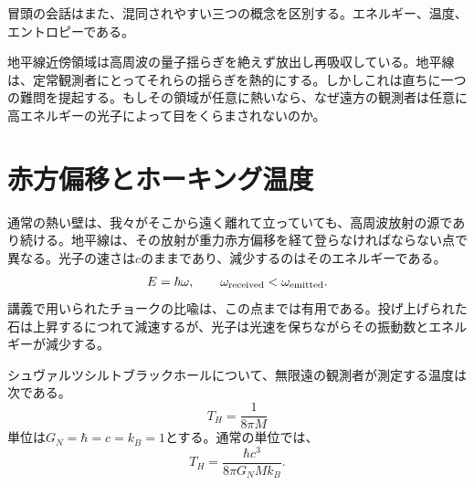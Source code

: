 冒頭の会話はまた、混同されやすい三つの概念を区別する。エネルギー、温度、エントロピーである。

\begin{classroomqa}
\end{classroomqa}


地平線近傍領域は高周波の量子揺らぎを絶えず放出し再吸収している。地平線は、定常観測者にとってそれらの揺らぎを熱的にする。しかしこれは直ちに一つの難問を提起する。もしその領域が任意に熱いなら、なぜ遠方の観測者は任意に高エネルギーの光子によって目をくらまされないのか。

\section{赤方偏移とホーキング温度}

通常の熱い壁は、我々がそこから遠く離れて立っていても、高周波放射の源であり続ける。地平線は、その放射が重力赤方偏移を経て登らなければならない点で異なる。光子の速さは\(c\)のままであり、減少するのはそのエネルギーである。
\begin{equation}
E=\hbar\omega,
\qquad
\omega_{\rm received}<\omega_{\rm emitted}.
\end{equation}
講義で用いられたチョークの比喩は、この点までは有用である。投げ上げられた石は上昇するにつれて減速するが、光子は光速を保ちながらその振動数とエネルギーが減少する。

シュヴァルツシルトブラックホールについて、無限遠の観測者が測定する温度は次である。
\begin{equation}
T_H=\frac{1}{8\pi M}
\label{eq:l09-hawking-natural}
\end{equation}
単位は\(G_N=\hbar=c=k_B=1\)とする。通常の単位では、
\begin{equation}
T_H=\frac{\hbar c^3}{8\pi G_N M k_B}.
\label{eq:l09-hawking-full}
\end{equation}

